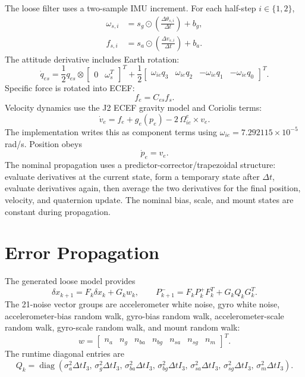 \documentclass[11pt]{article}
\newcommand{\T}{^{T}}
\newcommand{\dt}{\Delta t}
\begin{document}
The loose filter uses a two-sample IMU increment. For each half-step \(i\in
\{1,2\}\),
\begin{align}
  \omega_{s,i} &= s_g\odot\left(\frac{\Delta\theta_{s,i}}{\dt}\right)+b_g,\\
  f_{s,i} &= s_a\odot\left(\frac{\Delta v_{s,i}}{\dt}\right)+b_a .
\end{align}
The attitude derivative includes Earth rotation:
\begin{equation}
  \dot q_{es} =
  \frac{1}{2}q_{es}\otimes
  \begin{bmatrix}0&\omega_s\T\end{bmatrix}\T
  +\frac{1}{2}
  \begin{bmatrix}
  \omega_{ie} q_3 &
  \omega_{ie} q_2 &
  -\omega_{ie} q_1 &
  -\omega_{ie} q_0
  \end{bmatrix}\T .
\end{equation}
Specific force is rotated into ECEF:
\begin{equation}
  f_e=C_{es}f_s .
\end{equation}
Velocity dynamics use the J2 ECEF gravity model and Coriolis terms:
\begin{equation}
  \dot v_e =
  f_e + g_e(p_e) - 2\,\Omega_{ie}^{e}\times v_e .
\end{equation}
The implementation writes this as component terms using
\(\omega_{ie}=7.292115\times 10^{-5}\) rad/s. Position obeys
\begin{equation}
  \dot p_e=v_e .
\end{equation}
The nominal propagation uses a predictor-corrector/trapezoidal structure:
evaluate derivatives at the current state, form a temporary state after
\(\dt\), evaluate derivatives again, then average the two derivatives for the
final position, velocity, and quaternion update. The nominal bias, scale, and
mount states are constant during propagation.

\section{Error Propagation}

The generated loose model provides
\begin{equation}
  \delta x_{k+1}=F_k\delta x_k+G_kw_k,
  \qquad
  P_{k+1}^{-}=F_kP_k^{+}F_k\T+G_kQ_kG_k\T .
\end{equation}
The 21-noise vector groups are accelerometer white noise, gyro white noise,
accelerometer-bias random walk, gyro-bias random walk, accelerometer-scale
random walk, gyro-scale random walk, and mount random walk:
\begin{equation}
  w=
  \begin{bmatrix}
  n_a & n_g & n_{ba} & n_{bg} & n_{sa} & n_{sg} & n_m
  \end{bmatrix}\T .
\end{equation}
The runtime diagonal entries are
\begin{equation}
  Q_k=\operatorname{diag}\left(
  \sigma_a^2\dt I_3,\,
  \sigma_g^2\dt I_3,\,
  \sigma_{ba}^2\dt I_3,\,
  \sigma_{bg}^2\dt I_3,\,
  \sigma_{sa}^2\dt I_3,\,
  \sigma_{sg}^2\dt I_3,\,
  \sigma_m^2\dt I_3
  \right).
\end{equation}
\end{document}
